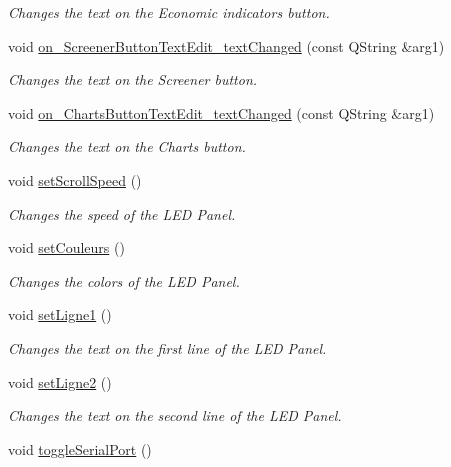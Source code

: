 \begin{DoxyCompactItemize}
\begin{DoxyCompactList}\small\item\em Changes the text on the Economic indicators button. \end{DoxyCompactList}\item 
void \hyperlink{class_t_k_r_t_a_p_a496a9cdf9ca2b12fef3201e2ccb8eac5}{on\+\_\+\+Screener\+Button\+Text\+Edit\+\_\+text\+Changed} (const Q\+String \&arg1)
\begin{DoxyCompactList}\small\item\em Changes the text on the Screener button. \end{DoxyCompactList}\item 
void \hyperlink{class_t_k_r_t_a_p_a05b206d46bedfd8063e85f4fbc331b11}{on\+\_\+\+Charts\+Button\+Text\+Edit\+\_\+text\+Changed} (const Q\+String \&arg1)
\begin{DoxyCompactList}\small\item\em Changes the text on the Charts button. \end{DoxyCompactList}\item 
\hypertarget{class_t_k_r_t_a_p_a9eb892a2a12c96d79d95968942811269}{void \hyperlink{class_t_k_r_t_a_p_a9eb892a2a12c96d79d95968942811269}{set\+Scroll\+Speed} ()}\label{class_t_k_r_t_a_p_a9eb892a2a12c96d79d95968942811269}

\begin{DoxyCompactList}\small\item\em Changes the speed of the L\+E\+D Panel. \end{DoxyCompactList}\item 
void \hyperlink{class_t_k_r_t_a_p_a6ddb840aa530eb4834f137907c82309f}{set\+Couleurs} ()
\begin{DoxyCompactList}\small\item\em Changes the colors of the L\+E\+D Panel. \end{DoxyCompactList}\item 
void \hyperlink{class_t_k_r_t_a_p_ad7900d7be69bfb772b4aa3de070dcb98}{set\+Ligne1} ()
\begin{DoxyCompactList}\small\item\em Changes the text on the first line of the L\+E\+D Panel. \end{DoxyCompactList}\item 
void \hyperlink{class_t_k_r_t_a_p_a2a86e3fb126a976efa13aae2bbf3d231}{set\+Ligne2} ()
\begin{DoxyCompactList}\small\item\em Changes the text on the second line of the L\+E\+D Panel. \end{DoxyCompactList}\item 
\hypertarget{class_t_k_r_t_a_p_ad037f38e28ef942688d7ad6e0bf4a62c}{void \hyperlink{class_t_k_r_t_a_p_ad037f38e28ef942688d7ad6e0bf4a62c}{toggle\+Serial\+Port} ()}\label{class_t_k_r_t_a_p_ad037f38e28ef942688d7ad6e0bf4a62c}


\end{DoxyCompactItemize}
